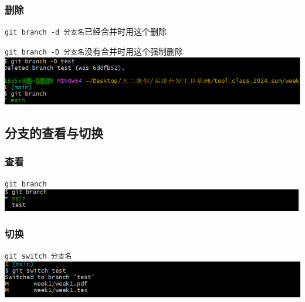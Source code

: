 \documentclass[UTF8,a4paper]{ctexart}
\begin{document}
\subsubsection{删除}
\verb|git branch -d 分支名|\quad 已经合并时用这个删除 \par
\verb|git branch -D 分支名|\quad 没有合并时用这个强制删除\\
\includegraphics[width=1\textwidth]{delete.png}

\subsection{分支的查看与切换}
\subsubsection{查看}
\verb|git branch|\\
\includegraphics[width=1\textwidth]{branch.png}
\subsubsection{切换}
\verb|git switch 分支名|\\
\includegraphics[width=1\textwidth]{switch.png}
\end{document}

